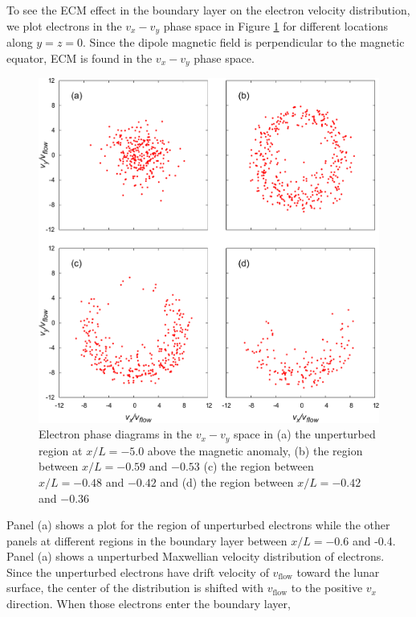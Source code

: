 \documentclass[draft,jgrga]{agutex2015}
\begin{document}
\begin{article}

To see the ECM effect in the boundary layer on the electron velocity distribution, 
we plot electrons in the $v_x-v_y$ phase space 
in Figure \ref{fig:10} for different locations along $y=z=0$.
Since the dipole magnetic field is perpendicular to the magnetic equator, 
ECM is found in the $v_x-v_y$ phase space.
\begin{figure}
\centering
\noindent\includegraphics[width=15cm]{./figures/Fig_10_bb-crop.pdf}
\caption{Electron phase diagrams in the $v_{x}-v_{y}$ space in 
(a) the unperturbed region at $x/L = -5.0$ above the magnetic anomaly, 
(b) the region between $x/L =-0.59$ and $-0.53$  
(c) the region between $x/L =-0.48$ and $-0.42$ and
(d) the region between $x/L =-0.42$ and $-0.36$ }
\label{fig:10}
\end{figure}
Panel (a) shows a plot for the region of 
unperturbed electrons while the other panels
at different regions in the boundary layer between $x/L = -0.6$ and -0.4.
Panel (a) shows a unperturbed Maxwellian velocity distribution of electrons.
Since the unperturbed electrons have 
drift velocity of $v_{\mathrm{flow}}$ toward the lunar surface,
the center of the distribution is shifted with $v_{\mathrm{flow}}$ 
to the positive $v_x$ direction.
%
When those electrons enter the boundary layer, 

\end{article}
\end{document}

